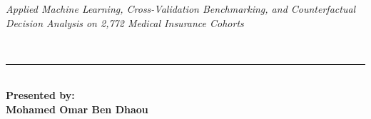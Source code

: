 \documentclass[12pt,a4paper]{report}
\begin{document}
\begin{titlepage}
\begin{center}
    \parbox{0.82\textwidth}{\centering
        \fontsize{11.5}{16.5}\selectfont \textit{Applied Machine Learning, Cross-Validation Benchmarking, and Counterfactual Decision Analysis on 2,772 Medical Insurance Cohorts}
    }\\[14mm]

    {\color{sagegreen}\rule{16mm}{2.5pt}}\\[14mm]

    {\fontsize{13}{16}\selectfont \textbf{\textcolor{deepnavy}{Presented by:}}}\\[3mm]
    {\fontsize{16}{20}\selectfont \textbf{\textcolor{deepnavy}{Mohamed Omar Ben Dhaou}}}

\end{center}
\end{titlepage}

\clearpage
{}
{
\makeatletter
\def\@makeschapterhead#1{%
  \vspace*{-12pt}%
  {\parindent \z@ \raggedright
    \normalfont
    \interlinepenalty\@M
    \Huge \bfseries #1\par\nobreak
    \vskip 14pt
  }}
\makeatother
\linespread{1.02}\selectfont
\fontsize{9.6pt}{12.0pt}\selectfont
\tableofcontents
}
\clearpage

\setcounter{page}{1}

{
\linespread{1.15}\selectfont
\listoffigures
}
\clearpage

{
\linespread{1.15}\selectfont
\listoftables
}
\clearpage

\end{document}
